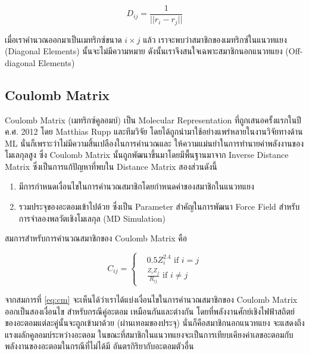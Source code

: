 \begin{equation}
    D_{ij} = \frac{1}{||r_{i} - r_{j}||}
\end{equation}

เมื่อเราคำนวณออกมาเป็นเมทริกซ์ขนาด $i \times j$ แล้ว เราจะพบว่าสมาชิกของเมทริกซ์ในแนวทแยง (Diagonal Elements) นั้นจะไม่มีความหมาย 
ดังนั้นเราจึงสนใจเฉพาะสมาชิกนอกแนวทแยง (Off-diagonal Elements)

\subsection{Coulomb Matrix}

Coulomb Matrix (เมทริกซ์คูลอมบ์) เป็น Molecular Representation ที่ถูกเสนอครั้งแรกในปี ค.ศ. 2012 โดย Matthias Rupp 
และทีมวิจัย\citeauthor{rupp2012} โดยได้ถูกนำมาใช้อย่างแพร่หลายในงานวิจัยทางด้าน ML นั่นก็เพราะว่าไม่มีความสิ้นเปลืองในการคำนวณและ%
ให้ความแม่นยำในการทำนายค่าพลังงานของโมเลกุลสูง ซึ่ง Coulomb Matrix นั้นถูกพัฒนาขึ้นมาโดยมีพื้นฐานมาจาก Inverse Distance Matrix 
ซึ่งเป็นการแก้ปัญหาที่พบใน Distance Matrix สองส่วนดังนี้

\begin{enumerate}
    \item มีการกำหนดเงื่อนไขในการคำนวณสมาชิกโดยกำหนดค่าของสมาชิกในแนวทแยง
    \item รวมประจุของอะตอมเข้าไปด้วย ซึ่งเป็น Parameter สำคัญในการพัฒนา Force Field สำหรับการจำลองพลวัตเชิงโมเลกุล (MD Simulation)
\end{enumerate}

สมการสำหรับการคำนวณสมาชิกของ Coulomb Matrix คือ

\begin{equation}
    \label{eq:cm}
    C_{ij} =
    \begin{cases}
     & 0.5 Z_i^{2.4} \text{ if } i = j \\ 
     & \frac{Z_i Z_j}{R_{ij}} \text{ if } i \neq j
    \end{cases}
\end{equation}

จากสมการที่ \ref{eq:cm} จะเห็นได้ว่าเราได้แบ่งเงื่อนไขในการคำนวณสมาชิกของ Coulomb Matrix ออกเป็นสองเงื่อนไข สำหรับกรณีคู่อะตอม%
เหมือนกันและต่างกัน โดยที่พลังงานศักย์เชิงไฟฟ้าสถิตย์ของอะตอมแต่ละคู่นั้นจะถูกเข้ามาด้วย (ผ่านเทอมของประจุ) นั่นก็คือสมาชิกนอกแนวทแยง%
จะแสดงถึงแรงผลักคูลอมบ์ระหว่างอะตอม ในขณะที่สมาชิกในแนวทแยงจะเป็นการเทียบเคียงค่าเลขอะตอมกับพลังงานของอะตอมในกรณีที่ไม่ได้มี%
อันตรกิริยากับอะตอมตัวอื่น

